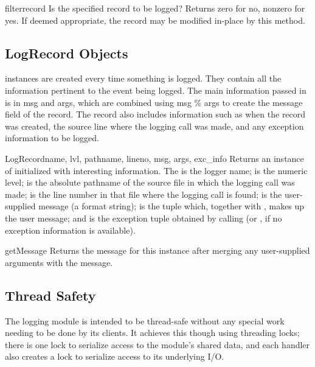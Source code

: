\begin{methoddesc}{filter}{record}
Is the specified record to be logged? Returns zero for no, nonzero for
yes. If deemed appropriate, the record may be modified in-place by this
method.
\end{methoddesc}

\subsection{LogRecord Objects}

 instances are created every time something is logged. They
contain all the information pertinent to the event being logged. The
main information passed in is in msg and args, which are combined
using msg \% args to create the message field of the record. The record
also includes information such as when the record was created, the
source line where the logging call was made, and any exception
information to be logged.

\begin{classdesc}{LogRecord}{name, lvl, pathname, lineno, msg, args,
                             exc_info}
Returns an instance of  initialized with interesting
information. The  is the logger name;  is the
numeric level;  is the absolute pathname of the source
file in which the logging call was made;  is the line
number in that file where the logging call is found;  is the
user-supplied message (a format string);  is the tuple
which, together with , makes up the user message; and
 is the exception tuple obtained by calling
(or , if no exception information
is available).
\end{classdesc}

\begin{methoddesc}{getMessage}{}
Returns the message for this  instance after merging any
user-supplied arguments with the message.
\end{methoddesc}

\subsection{Thread Safety}

The logging module is intended to be thread-safe without any special work
needing to be done by its clients. It achieves this though using threading
locks; there is one lock to serialize access to the module's shared data,
and each handler also creates a lock to serialize access to its underlying
I/O.

